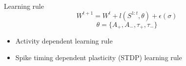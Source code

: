 \documentclass[aspectratio=169]{beamer}
\begin{document}
	\begin{frame}{Learning rule}
	    \begin{equation}
	        W^{t+1} = W^t + l(S^{1:t}, \theta) + \epsilon(\sigma) \nonumber
	   \end{equation}
	   \begin{equation}
	        \theta = \{A_+,A_-, \tau_+, \tau_- \}
	        \nonumber
	    \end{equation}
	    
	    \begin{itemize}
	        \item Activity dependent learning rule
	        \item Spike timing dependent plasticity (STDP) learning rule
	    \end{itemize}
	    

\end{frame}
\end{document}
